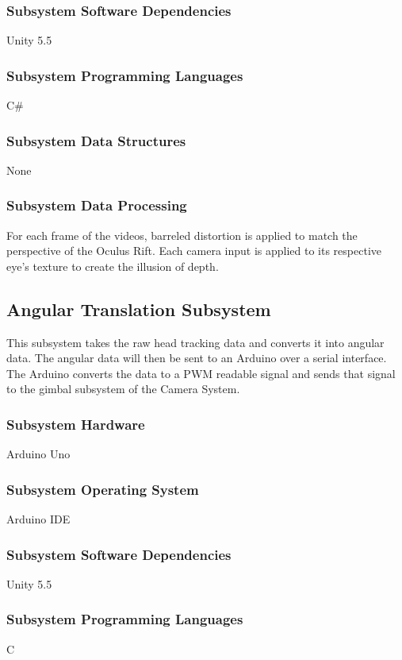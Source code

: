 \subsubsection{Subsystem Software Dependencies}
Unity 5.5

\subsubsection{Subsystem Programming Languages}
C\#

\subsubsection{Subsystem Data Structures}
None

\subsubsection{Subsystem Data Processing}
For each frame of the videos, barreled distortion is applied to match the perspective of the Oculus Rift. Each camera input is applied to its respective eye's texture to create the illusion of depth.

\subsection{Angular Translation Subsystem}
This subsystem takes the raw head tracking data and converts it into angular data. The angular data will then be sent to an Arduino over a serial interface. The Arduino converts the data to a PWM readable signal and sends that signal to the gimbal subsystem of the Camera System.

\subsubsection{Subsystem Hardware}
Arduino Uno

\subsubsection{Subsystem Operating System}
Arduino IDE

\subsubsection{Subsystem Software Dependencies}
Unity 5.5

\subsubsection{Subsystem Programming Languages}
C

